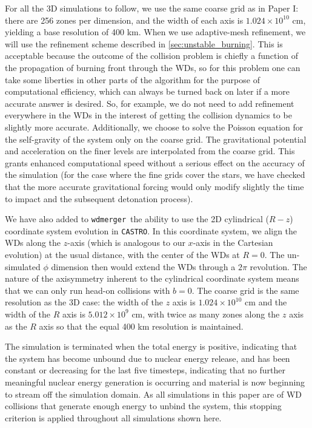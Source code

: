 \documentclass[twocolumn,numberedappendix]{../aastex6}
\newcommand{\castro}{\texttt{CASTRO}}
\newcommand{\wdmerger}{\texttt{wdmerger}}
\begin{document}
For all the 3D simulations to follow, we use the same coarse grid as in Paper I:
there are 256 zones per dimension, and the width of each axis is $1.024 \times 10^{10}$
cm, yielding a base resolution of 400 km. When we use adaptive-mesh refinement, we will
use the refinement scheme described in \autoref{sec:unstable_burning}. This is
acceptable because the outcome of the collision problem is chiefly a function
of the propagation of burning front through the WDs, so for this problem one
can take some liberties in other parts of the algorithm for the purpose of
computational efficiency, which can always be turned back on later if a more
accurate answer is desired. So, for example, we do not need to add refinement
everywhere in the WDs in the interest of getting the collision dynamics to be
slightly more accurate. Additionally, we choose to solve the Poisson equation
for the self-gravity of the system only on the coarse grid. The gravitational
potential and acceleration on the finer levels are interpolated from the coarse
grid. This grants enhanced computational speed without a serious effect on the
accuracy of the simulation (for the case where the fine grids cover the stars,
we have checked that the more accurate gravitational forcing would only modify
slightly the time to impact and the subsequent detonation process).

We have also added to \wdmerger\ the ability to use the 2D cylindrical ($R-z$)
coordinate system evolution in \castro. In this coordinate system, we align
the WDs along the $z$-axis (which is analogous to our $x$-axis in the Cartesian
evolution) at the usual distance, with the center of the WDs at $R = 0$. The
un-simulated $\phi$ dimension then would extend the WDs through a $2\pi$ revolution.
The nature of the axisymmetry inherent to the cylindrical coordinate system
means that we can only run head-on collisions with $b = 0$. The coarse grid
is the same resolution as the 3D case: the width of the $z$ axis is $1.024 \times 10^{10}$
cm and the width of the $R$ axis is $5.012 \times 10^{9}$ cm, with twice as
many zones along the $z$ axis as the $R$ axis so that the equal 400 km
resolution is maintained.

The simulation is terminated when the total energy is positive, indicating that
the system has become unbound due to nuclear energy release, and has been
constant or decreasing for the last five timesteps, indicating that no further
meaningful nuclear energy generation is occurring and material is now beginning
to stream off the simulation domain. As all simulations in this paper are of
WD collisions that generate enough energy to unbind the system, this stopping
criterion is applied throughout all simulations shown here.
\end{document}
